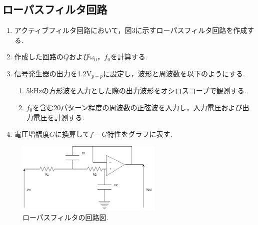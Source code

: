 \documentclass[twocolumn, 10pt,a4j]{jsarticle}
\begin{document}
    \subsection{ローパスフィルタ回路}
        \begin{enumerate}
          \item アクティブフィルタ回路において，図3に示すローパスフィルタ回路を作成する. \\
          \item 作成した回路の$Q$および$\omega_{0}，f_{0}$を計算する. \\
          \item 信号発生器の出力を1.2V$_{p-p}$に設定し，波形と周波数を以下のようにする. \\
              \begin{enumerate}
                  \item 5kHzの方形波を入力とした際の出力波形をオシロスコープで観測する. \\
                  \item $f_{0}$を含む20パターン程度の周波数の正弦波を入力し，入力電圧および出力電圧を計測する.
              \end{enumerate}
          \item 電圧増幅度$G$に換算して$f-G$特性をグラフに表す.
        \end{enumerate}

        \begin{figure}[]
          \begin{center}
              \includegraphics[width=7cm]{../img/ro-pasu.png}
              \caption{ローパスフィルタの回路図.}
          \end{center}
        \end{figure}
      
\end{document}
